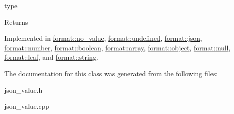type 

\begin{DoxyReturn}{Returns}

\end{DoxyReturn}


Implemented in \hyperlink{classformat_1_1no__value_a2819b3ce13265c40a74d4f11c2577bf5}{format\+::no\+\_\+value}, \hyperlink{classformat_1_1undefined_a72e4ff819514b2a4126be1969d5bbabe}{format\+::undefined}, \hyperlink{classformat_1_1json_a970027799aac71bf99e3f1d7264364dc}{format\+::json}, \hyperlink{classformat_1_1number_a1934b4d3cf603de3afd5eb6329be7fba}{format\+::number}, \hyperlink{classformat_1_1boolean_a91dccd7986764af76b70627a348f27a4}{format\+::boolean}, \hyperlink{classformat_1_1array_a0fe16076f81ccc66e8208fe6dd4d2b1a}{format\+::array}, \hyperlink{classformat_1_1object_aea7eb835fcbec62a85d078a7fa33cea7}{format\+::object}, \hyperlink{classformat_1_1null_a3878d16875e190e0f319bf6f600883c9}{format\+::null}, \hyperlink{classformat_1_1leaf_ac29de88719f2da4d262255ef8a234ced}{format\+::leaf}, and \hyperlink{classformat_1_1string_a247e17aaf8cb8e0afdc29e943d492232}{format\+::string}.



The documentation for this class was generated from the following files\+:\begin{DoxyCompactItemize}
\item 
json\+\_\+value.\+h\item 
json\+\_\+value.\+cpp\end{DoxyCompactItemize}
